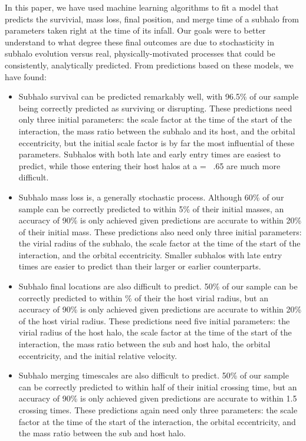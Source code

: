 \documentclass[fleqn,usenatbib]{mnras}
\begin{document}
In this paper, we have used machine learning algorithms to fit a model that predicts the survivial, mass loss, final position, and merge time of a subhalo from parameters taken right at the time of its infall. Our goals were to better understand to what degree these final outcomes are due to stochasticity in subhalo evolution versus real, physically-motivated processes that could be consistently, analytically predicted. From predictions based on these models, we have found:
\begin{itemize}
    \item Subhalo survival can be predicted remarkably well, with 96.5\% of our sample being correctly predicted as surviving or disrupting. These predictions need only three initial parameters: the scale factor at the time of the start of the interaction, the mass ratio between the subhalo and its host, and the orbital eccentricity, but the initial scale factor is by far the most influential of these parameters. Subhalos with both late and early entry times are easiest to predict, while those entering their host halos at a = ~.65 are much more difficult.
    \item Subhalo mass loss is, a generally stochastic process. Although 60\% of our sample can be correctly predicted to within 5\% of their initial masses, an accuracy of 90\% is only achieved given predictions are accurate to within 20\% of their initial mass. These predictions also need only three initial parameters: the virial radius of the subhalo, the scale factor at the time of the start of the interaction, and the orbital eccentricity. Smaller subhalos with late entry times are easier to predict than their larger or earlier counterparts.
    \item Subhalo final locations are also difficult to predict. 50\% of our sample can be correctly predicted to within \% of their the host virial radius, but an accuracy of 90\% is only achieved given predictions are accurate to within 20\% of the host virial radius. These predictions need five initial parameters: the virial radius of the host halo, the scale factor at the time of the start of the interaction, the mass ratio between the sub and host halo, the orbital eccentricity, and the initial relative velocity.
    \item Subhalo merging timescales are also difficult to predict. 50\% of our sample can be correctly predicted to within half of their initial crossing time, but an accuracy of 90\% is only achieved given predictions are accurate to within 1.5 crossing times. These predictions again need only three parameters: the scale factor at the time of the start of the interaction, the orbital eccentricity, and the mass ratio between the sub and host halo. 
\end{itemize}
\end{document}

